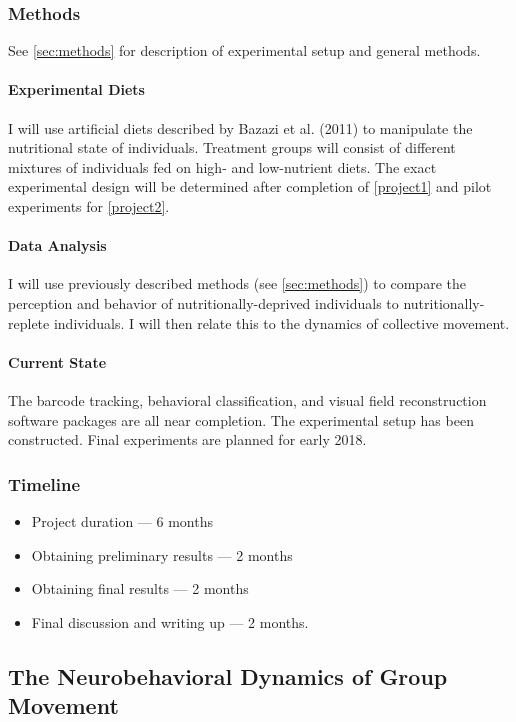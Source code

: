 \documentclass[11pt,a4paper,oneside]{article}
\begin{document}
\subsubsection{Methods}

See \ref{sec:methods} for description of experimental setup and general methods.

\paragraph{Experimental Diets}
I will use artificial diets described by Bazazi et al. (2011) to manipulate the nutritional state of individuals. Treatment groups will consist of different mixtures of individuals fed on high- and low-nutrient diets. The exact experimental design will be determined after completion of  \ref{project1} and pilot experiments for \ref{project2}.

\paragraph{Data Analysis}
I will use previously described methods (see \ref{sec:methods}) to compare the perception and behavior of nutritionally-deprived individuals to nutritionally-replete individuals. I will then relate this to the dynamics of collective movement.

\paragraph{Current State}
The barcode tracking, behavioral classification, and visual field reconstruction software packages are all near completion. The experimental setup has been constructed. Final experiments are planned for early 2018.

\subsubsection{Timeline}
\begin{itemize}{}{}
	\item Project duration --- 6 months
	\item Obtaining preliminary results --- 2 months
	\item Obtaining final results --- 2 months	
	\item Final discussion and writing up --- 2 months.
\end{itemize}

\subsection{The Neurobehavioral Dynamics of Group Movement}
\end{document}
